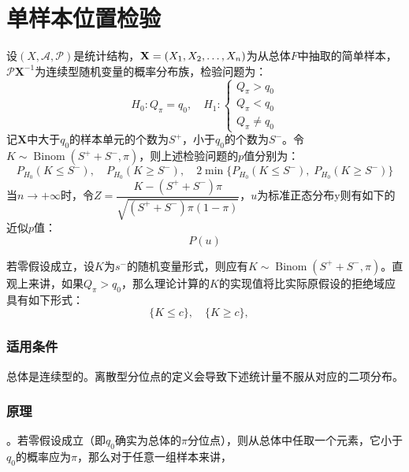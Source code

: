 \section{单样本位置检验}

\begin{method}
	设$(X,\mathscr{A},\mathscr{P})$是统计结构，$\mathbf{X}=(X_1, X_2, \dots, X_{n})$为从总体$F$中抽取的简单样本，$\mathscr{P}\mathbf{X}^{-1}$为连续型随机变量的概率分布族，检验问题为：
	\begin{equation*}
		H_0:Q_\pi=q_0,\quad H_1:
		\begin{cases}
			Q_\pi>q_0 \\
			Q_\pi<q_0 \\
			Q_\pi\ne q_0
		\end{cases}
	\end{equation*}
	记$\mathbf{X}$中大于$q_0$的样本单元的个数为$S^+$，小于$q_0$的个数为$S^-$。令$K\sim\operatorname{Binom}(S^++S^-,\pi)$，则上述检验问题的$p$值分别为：
	\begin{equation*}
		P_{H_0}(K\leqslant S^-),\quad P_{H_0}(K\geqslant S^-),\quad 2\min\{P_{H_0}(K\leqslant S^-),\;P_{H_0}(K\geqslant S^-)\}
	\end{equation*}
	当$n\to+\infty$时，令$Z=\dfrac{K-(S^++S^-)\pi}{\sqrt{(S^++S^-)\pi(1-\pi)}}$，$u$为标准正态分布y则有如下的近似$p$值：
	\begin{equation*}
		P(u)
	\end{equation*}
\end{method}
\begin{derivation}
	若零假设成立，设$K$为$s^-$的随机变量形式，则应有$K\sim\operatorname{Binom}(S^++S^-,\pi)$。直观上来讲，如果$Q_{\pi}>q_0$，那么理论计算的$K$的实现值将比实际原假设的拒绝域应具有如下形式：
	\begin{equation*}
		\{K\leqslant c\},\quad\{K\geqslant c\},\quad
	\end{equation*}
\end{derivation}

\subsubsection{适用条件}
总体是连续型的。离散型分位点的定义会导致下述统计量不服从对应的二项分布。
\subsubsection{原理}
。若零假设成立（即$q_0$确实为总体的$\pi$分位点），则从总体中任取一个元素，它小于$q_0$的概率应为$\pi$，那么对于任意一组样本来讲，

